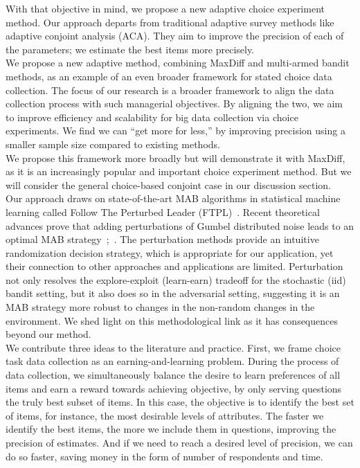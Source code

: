 \documentclass[nonblindrev]{informs3}
\begin{document}
With that objective in mind, we propose a new adaptive choice experiment method. 
Our approach departs from traditional adaptive survey methods like adaptive conjoint analysis (ACA). They aim to improve the precision of each of the parameters; we estimate the best items more precisely. \\
We propose a new adaptive method, combining MaxDiff and multi-armed bandit methods, as an example of an even broader framework for stated choice data collection. The focus of our research is a broader framework to align the data collection process with such managerial objectives. By aligning the two, we aim to improve efficiency and scalability for big data collection via choice experiments. We find we can ``get more for less,'' by improving precision using a smaller sample size compared to existing methods.\\
We propose this framework more broadly but will demonstrate it with MaxDiff, as it is an increasingly popular and important choice experiment method. But we will consider the general choice-based conjoint case in our discussion section. \\
Our approach draws on state-of-the-art MAB algorithms in statistical machine learning called Follow The Perturbed Leader (FTPL)~\cite{kalai2005efficient}. Recent theoretical advances prove that adding perturbations of Gumbel distributed noise leads to an optimal MAB strategy~\cite{abernethy2015fighting};~\cite{kujala2005following}. The perturbation methods provide an intuitive randomization decision strategy, which is appropriate for our application, yet their connection to other approaches and applications are limited. Perturbation not only resolves the explore-exploit (learn-earn) tradeoff for the stochastic (iid) bandit setting, but it also does so in the adversarial setting, suggesting it is an MAB strategy more robust to changes in the non-random changes in the environment. We shed light on this methodological link as it has consequences beyond our method.\\
We contribute three ideas to the literature and practice. First, we frame choice task data collection as an earning-and-learning problem. During the process of data collection, we simultaneously balance the desire to learn preferences of all items and earn a reward towards achieving objective, by only serving questions the truly best subset of items. In this case, the objective is to identify the best set of items, for instance, the most desirable levels of attributes. The faster we identify the best items, the more we include them in questions, improving the precision of estimates. And if we need to reach a desired level of precision, we can do so faster, saving money in the form of number of respondents and time. %
\end{document}
